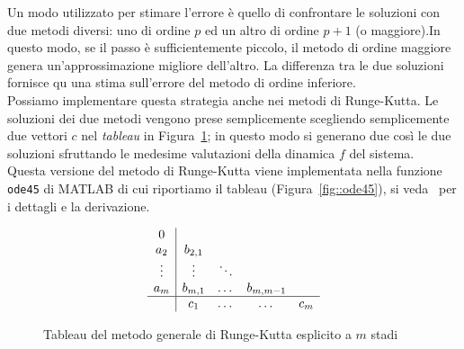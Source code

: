 Un modo utilizzato  per stimare l'errore  \`e quello di confrontare le soluzioni con  due metodi diversi: uno di ordine $p$ ed un altro di ordine $p+1$ (o maggiore).In questo modo, se il passo \`e sufficientemente piccolo,  il metodo di ordine maggiore genera un'approssimazione migliore dell'altro.  La differenza tra le due soluzioni fornisce qu una stima sull'errore del metodo di ordine inferiore.\\
Possiamo implementare questa strategia anche nei metodi di Runge-Kutta.  Le soluzioni dei due metodi vengono prese semplicemente scegliendo semplicemente due vettori $c$ nel \emph{tableau} in Figura~\ref{fig::tableau}; in questo modo si generano due cos\`i le due soluzioni sfruttando le medesime valutazioni della dinamica $f$ del sistema.\\
Questa versione del metodo di Runge-Kutta viene implementata nella funzione \texttt{ode45} di MATLAB di cui riportiamo il tableau (Figura~\ref{fig::ode45}), si veda~\cite{ode_matlab} per i dettagli e la derivazione.
\begin{figure}[!htb]
$$\begin{array}{c|cccc}
 0 & \\
 
 a_2 	& b_{2,1}	& 			& 			& 	\\
 \vdots & \vdots 	& \ddots 	&			&	\\
  a_m 	& b_{m,1}	& \dots		& b_{m,m-1}	&	\\
  \hline
		& c_1 		& \dots 	& \dots 	&c_m
\end{array}$$
	\caption{Tableau del metodo generale di Runge-Kutta esplicito a $m$ stadi}	
	\label{fig::tableau}
\end{figure}
